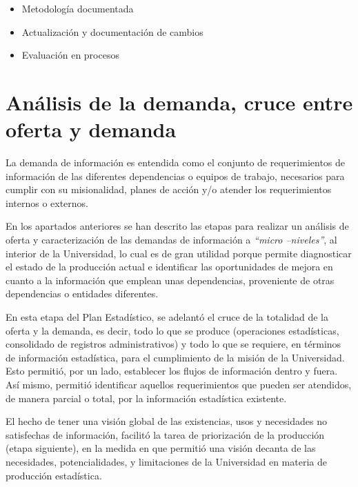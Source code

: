 \documentclass[
]{book}
\providecommand{\tightlist}{%
  \setlength{\itemsep}{0pt}\setlength{\parskip}{0pt}}
\begin{document}
\begin{itemize}
\begin{itemize}
    \begin{itemize}
    \tightlist
    \item
      Metodología documentada
    \item
      Actualización y documentación de cambios
    \item
      Evaluación en procesos
    \end{itemize}
  \end{itemize}
\end{itemize}

\hypertarget{anuxe1lisis-de-la-demanda-cruce-entre-oferta-y-demanda}{%
\section{Análisis de la demanda, cruce entre oferta y demanda}\label{anuxe1lisis-de-la-demanda-cruce-entre-oferta-y-demanda}}

La demanda de información es entendida como el conjunto de requerimientos de información de
las diferentes dependencias o equipos de trabajo, necesarios para cumplir con su misionalidad,
planes de acción y/o atender los requerimientos internos o externos.

En los apartados anteriores se han descrito las etapas para realizar un análisis de oferta y
caracterización de las demandas de información a \emph{``micro --niveles''}, al interior de la Universidad, lo
cual es de gran utilidad porque permite diagnosticar el estado de la producción actual e identificar
las oportunidades de mejora en cuanto a la información que emplean unas dependencias,
proveniente de otras dependencias o entidades diferentes.

En esta etapa del Plan Estadístico, se adelantó el cruce de la totalidad de la oferta y la demanda,
es decir, todo lo que se produce (operaciones estadísticas, consolidado de registros
administrativos) y todo lo que se requiere, en términos de información estadística, para el
cumplimiento de la misión de la Universidad. Esto permitió, por un lado, establecer los flujos de
información dentro y fuera. Así mismo, permitió identificar aquellos requerimientos que pueden
ser atendidos, de manera parcial o total, por la información estadística existente.

El hecho de tener una visión global de las existencias, usos y necesidades no satisfechas de
información, facilitó la tarea de priorización de la producción (etapa siguiente), en la medida en
que permitió una visión decanta de las necesidades, potencialidades, y limitaciones de la Universidad
en materia de producción estadística.
\end{document}
